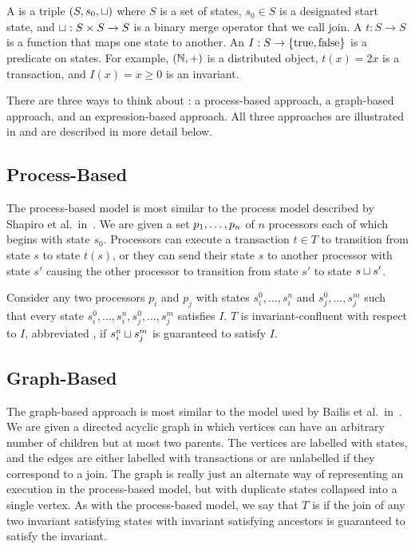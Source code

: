 \section{\Iconfluence{}}
A  is a triple $(S, s_0, \sqcup)$ where $S$ is a set
of states, $s_0 \in S$ is a designated start state, and $\sqcup: S \times S \to
S$ is a binary merge operator that we call join. A  $t: S
\to S$ is a function that maps one state to another.  An 
$I: S \to \{\text{true}, \text{false}\}$ is a predicate on states. For
example, $(\mathbb{N}, +)$ is a distributed object, $t(x) = 2x$ is a transaction,
and $I(x) = x \geq 0$ is an invariant.

There are three ways to think about \Iconfluence{}: a process-based approach, a
graph-based approach, and an expression-based approach. All three approaches
are illustrated in  and are described in more
detail below.



\subsection{Process-Based}
The process-based model is most similar to the process model described by
Shapiro et al.\ in~\cite{shapiro2011conflict}. We are given a set
${p}_{1}, \ldots, {p}_{n}$ of $n$ processors each of which begins with state $s_0$.
Processors can execute a transaction $t \in T$ to transition from state $s$ to
state $t(s)$, or they can send their state $s$ to another processor with state
$s'$ causing the other processor to transition from state $s'$ to state $s
\sqcup s'$.

Consider any two processors $p_i$ and $p_j$ with states $s_i^0, \ldots, s_i^n$
and $s_j^0, \ldots, s_j^m$ such that every state $s_i^0, \ldots, s_i^n, s_j^0,
\ldots, s_j^m$ satisfies $I$. $T$ is invariant-confluent with respect to $I$,
abbreviated , if $s_i^n \sqcup s_j^m$ is guaranteed to
satisfy $I$.

\subsection{Graph-Based}
The graph-based approach is most similar to the model used by Bailis et al.\
in~\cite{bailis2014coordination}. We are given a directed acyclic graph in
which vertices can have an arbitrary number of children but at most two
parents. The vertices are labelled with states, and the edges are either
labelled with transactions or are unlabelled if they correspond to a join. The
graph is really just an alternate way of representing an execution in the
process-based model, but with duplicate states collapsed into a single vertex.
As with the process-based model, we say that $T$ is \Iconfluent{} if the join
of any two invariant satisfying states with invariant satisfying ancestors is
guaranteed to satisfy the invariant.

